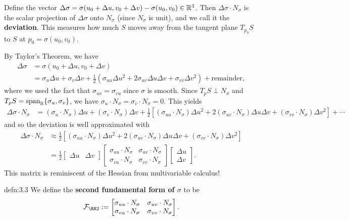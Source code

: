 Define the vector $\Delta \sigma = \sigma(u_0 + \Delta u, v_0 + \Delta v) 
- \sigma(u_0, v_0) \in \mathbb{R}^3$. Then $\Delta\sigma \cdot N_\sigma$ is 
the scalar projection of $\Delta\sigma$ onto $N_\sigma$ (since 
$N_\sigma$ is unit), and we call it the {\bf deviation}. This 
measures how much $S$ moves away from the tangent plane $T_{p_0}S$ 
to $S$ at $p_0 = \sigma(u_0, v_0)$. 

By Taylor's Theorem, we have 
\begin{align*}
    \Delta\sigma 
    &= \sigma(u_0 + \Delta u, v_0 + \Delta v) \\
    &= \sigma_u \Delta u + \sigma_v \Delta v 
    + \frac12 (\sigma_{uu} \Delta u^2 + 2\sigma_{uv} \Delta u \Delta v 
    + \sigma_{vv} \Delta v^2) + \text{remainder}, 
\end{align*}
where we used the fact that $\sigma_{uv} = \sigma_{vu}$ since $\sigma$ is smooth.
Since $T_pS \perp N_\sigma$ and $T_pS = \operatorname{span}_{\mathbb{R}}\{\sigma_u, \sigma_v\}$, we have 
$\sigma_u \cdot N_\sigma = \sigma_v \cdot N_\sigma = 0$. This yields 
\begin{align*}
    \Delta\sigma \cdot N_\sigma 
    &= (\sigma_u \cdot N_\sigma)\Delta u + (\sigma_v \cdot N_\sigma) \Delta v 
    + \frac12 [(\sigma_{uu} \cdot N_\sigma) \Delta u^2 + 2(\sigma_{uv} \cdot N_\sigma) 
    \Delta u \Delta v + (\sigma_{vv} \cdot N_\sigma)\Delta v^2] + \cdots
\end{align*}
and so the deviation is well approximated with 
\begin{align*} 
    \Delta\sigma \cdot N_\sigma 
    &\approx \frac12 [(\sigma_{uu} \cdot N_\sigma) 
    \Delta u^2 + 2(\sigma_{uv} \cdot N_\sigma) \Delta u \Delta v + (\sigma_{vv} 
    \cdot N_\sigma)\Delta v^2] \\
    &= \frac12\begin{bmatrix} \Delta u & \Delta v \end{bmatrix} 
    \begin{bmatrix}
        \sigma_{uu} \cdot N_\sigma & \sigma_{uv} \cdot N_\sigma \\ 
        \sigma_{vu} \cdot N_\sigma & \sigma_{vv} \cdot N_\sigma
    \end{bmatrix} \begin{bmatrix}
        \Delta u \\ \Delta v
    \end{bmatrix}.
\end{align*} 
This matrix is reminiscent of the Hessian from multivariable calculus!

\begin{defn}{defn:3.3}
    We define the {\bf second fundamental form of $\sigma$} to be 
    \[ \SFF := \begin{bmatrix}
        \sigma_{uu} \cdot N_\sigma & \sigma_{uv} \cdot N_\sigma \\ 
        \sigma_{vu} \cdot N_\sigma & \sigma_{vv} \cdot N_\sigma
    \end{bmatrix}. \]
\end{defn}\vspace{-0.25cm}


